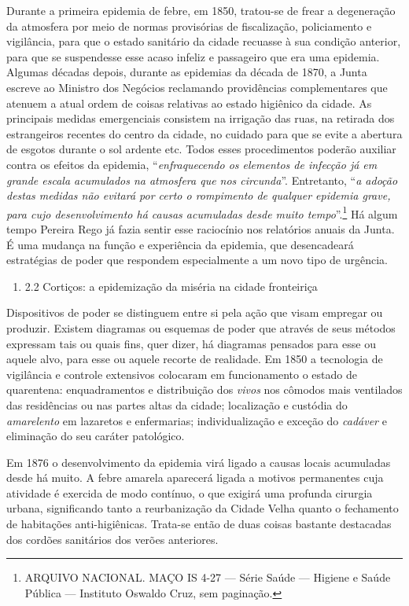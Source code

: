 Durante a primeira epidemia de febre, em 1850, tratou-se de frear a
degeneração da atmosfera por meio de normas provisórias de fiscalização,
policiamento e vigilância, para que o estado sanitário da cidade
recuasse à sua condição anterior, para que se suspendesse esse acaso
infeliz e passageiro que era uma epidemia. Algumas décadas depois,
durante as epidemias da década de 1870, a Junta escreve ao Ministro dos
Negócios reclamando providências complementares que atenuem a atual
ordem de coisas relativas ao estado higiênico da cidade. As principais
medidas emergenciais consistem na irrigação das ruas, na retirada dos
estrangeiros recentes do centro da cidade, no cuidado para que se evite
a abertura de esgotos durante o sol ardente etc. Todos esses
procedimentos poderão auxiliar contra os efeitos da epidemia,
``\textit{enfraquecendo os elementos de infecção já em grande escala
acumulados na atmosfera que nos circunda}''. Entretanto, ``\textit{a
adoção destas medidas não evitará por certo o rompimento de qualquer
epidemia grave, para cujo desenvolvimento há causas acumuladas desde
muito tempo}''.\footnote{ARQUIVO NACIONAL. MAÇO IS 4-27 --- Série Saúde
  --- Higiene e Saúde Pública --- Instituto Oswaldo Cruz, sem paginação.}
Há algum tempo Pereira Rego já fazia sentir esse raciocínio nos
relatórios anuais da Junta. É uma mudança na função e experiência da
epidemia, que desencadeará estratégias de poder que respondem
especialmente a um novo tipo de urgência.

\begin{enumerate}
\def\labelenumi{\arabic{enumi}.}
\setcounter{enumi}{3}
\tightlist
\item
  2.2 Cortiços: a epidemização da miséria na cidade fronteiriça
\end{enumerate}

Dispositivos de poder se distinguem entre si pela ação que visam
empregar ou produzir. Existem diagramas ou esquemas de poder que através
de seus métodos expressam tais ou quais fins, quer dizer, há diagramas
pensados para esse ou aquele alvo, para esse ou aquele recorte de
realidade. Em 1850 a tecnologia de vigilância e controle extensivos
colocaram em funcionamento o estado de quarentena: enquadramentos e
distribuição dos \textit{vivos} nos cômodos mais ventilados das
residências ou nas partes altas da cidade; localização e custódia do
\textit{amarelento} em lazaretos e enfermarias; individualização e exceção
do \textit{cadáver} e eliminação do seu caráter patológico.

Em 1876 o desenvolvimento da epidemia virá ligado a causas locais
acumuladas desde há muito. A febre amarela aparecerá ligada a motivos
permanentes cuja atividade é exercida de modo contínuo, o que exigirá
uma profunda cirurgia urbana, significando tanto a reurbanização da
Cidade Velha quanto o fechamento de habitações anti-higiênicas. Trata-se
então de duas coisas bastante destacadas dos cordões sanitários dos
verões anteriores.

